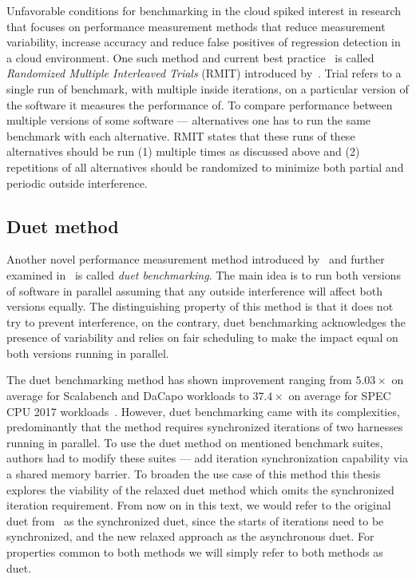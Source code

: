 Unfavorable conditions for benchmarking in the cloud spiked interest in research that focuses on performance measurement methods that reduce measurement variability, increase accuracy and reduce false positives of regression detection in a cloud environment.
One such method and current best practice~\cite{laaber2019software} is called \emph{Randomized Multiple Interleaved Trials} (RMIT) introduced by~\citet{abedi2017conducting}.
Trial refers to a single run of benchmark, with multiple inside iterations, on a particular version of the software it measures the performance of.
To compare performance between multiple versions of some software --- alternatives one has to run the same benchmark with each alternative.
RMIT states that these runs of these alternatives should be run (1) multiple times as discussed above and (2) repetitions of all alternatives should be randomized to minimize both partial and periodic outside interference.

\subsection{Duet method}
Another novel performance measurement method introduced by~\citet{bulej2019initial} and further examined in~\citet{bulej2020duet} is called \emph{duet benchmarking}.
The main idea is to run both versions of software in parallel assuming that any outside interference will affect both versions equally.
The distinguishing property of this method is that it does not try to prevent interference, on the contrary, duet benchmarking acknowledges the presence of variability and relies on fair scheduling to make the impact equal on both versions running in parallel.

The duet benchmarking method has shown improvement ranging from $5.03 \times$ on average for Scalabench and DaCapo workloads to $37.4 \times$ on average for SPEC CPU 2017 workloads~\cite{bulej2022duet}.
However, duet benchmarking came with its complexities, predominantly that the method requires synchronized iterations of two harnesses running in parallel.
To use the duet method on mentioned benchmark suites, authors had to modify these suites --- add iteration synchronization capability via a shared memory barrier.
To broaden the use case of this method this thesis explores the viability of the relaxed duet method which omits the synchronized iteration requirement.
From now on in this text, we would refer to the original duet from~\citet{bulej2020duet} as the synchronized duet, since the starts of iterations need to be synchronized, and the new relaxed approach as the asynchronous duet.
For properties common to both methods we will simply refer to both methods as duet.
